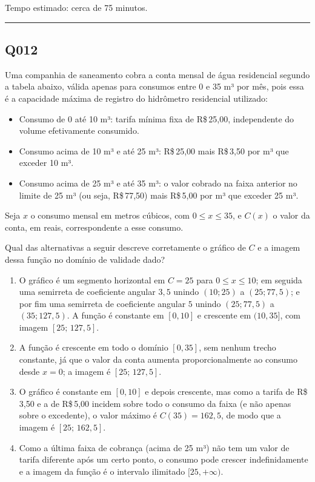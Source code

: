 \documentclass[11pt,a4paper]{article}
\begin{document}
Tempo estimado: cerca de 75 minutos.
\bigskip\hrule\bigskip
\begin{samepage}
\subsection*{Q012}
Uma companhia de saneamento cobra a conta mensal de água residencial segundo a tabela abaixo, válida apenas para consumos entre 0 e 35 m³ por mês, pois essa é a capacidade máxima de registro do hidrômetro residencial utilizado:

\begin{itemize}[nosep,leftmargin=*]
\item Consumo de 0 até 10 m³: tarifa mínima fixa de R\$\,25,00, independente do volume efetivamente consumido.
\item Consumo acima de 10 m³ e até 25 m³: R\$\,25,00 mais R\$\,3,50 por m³ que exceder 10 m³.
\item Consumo acima de 25 m³ e até 35 m³: o valor cobrado na faixa anterior no limite de 25 m³ (ou seja, R\$\,77,50) mais R\$\,5,00 por m³ que exceder 25 m³.
\end{itemize}

Seja $x$ o consumo mensal em metros cúbicos, com $0 \le x \le 35$, e $C(x)$ o valor da conta, em reais, correspondente a esse consumo.

Qual das alternativas a seguir descreve corretamente o gráfico de $C$ e a imagem dessa função no domínio de validade dado?
\begin{enumerate}[label=(\alph*),nosep,leftmargin=*]
\item O gráfico é um segmento horizontal em $C=25$ para $0 \le x \le 10$; em seguida uma semirreta de coeficiente angular $3{,}5$ unindo $(10;25)$ a $(25;77{,}5)$; e por fim uma semirreta de coeficiente angular $5$ unindo $(25;77{,}5)$ a $(35;127{,}5)$. A função é constante em $[0,10]$ e crescente em $(10,35]$, com imagem $[25;\,127{,}5]$.
\item A função é crescente em todo o domínio $[0,35]$, sem nenhum trecho constante, já que o valor da conta aumenta proporcionalmente ao consumo desde $x=0$; a imagem é $[25;\,127{,}5]$.
\item O gráfico é constante em $[0,10]$ e depois crescente, mas como a tarifa de R\$\,3,50 e a de R\$\,5,00 incidem sobre todo o consumo da faixa (e não apenas sobre o excedente), o valor máximo é $C(35) = 162{,}5$, de modo que a imagem é $[25;\,162{,}5]$.
\item Como a última faixa de cobrança (acima de 25 m³) não tem um valor de tarifa diferente após um certo ponto, o consumo pode crescer indefinidamente e a imagem da função é o intervalo ilimitado $[25, +\infty)$.
\end{enumerate}


\end{samepage}
\end{document}
